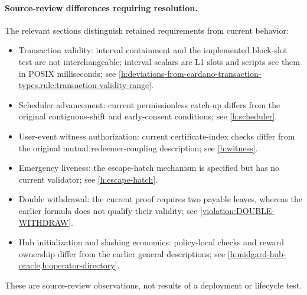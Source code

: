 \documentclass[../midgard.tex]{subfiles}
\begin{document}
\paragraph{Source-review differences requiring resolution.}
The relevant sections distinguish retained requirements from current behavior:
\begin{itemize}
  \item Transaction validity: interval containment and the implemented block-slot test are not interchangeable; interval scalars are L1 slots and scripts see them in POSIX milliseconds; see \cref{h:deviations-from-cardano-transaction-types,rule:transaction-validity-range}.
  \item Scheduler advancement: current permissionless catch-up differs from the original contiguous-shift and early-consent conditions; see \cref{h:scheduler}.
  \item User-event witness authorization: current certificate-index checks differ from the original mutual redeemer-coupling description; see \cref{h:witness}.
  \item Emergency liveness: the escape-hatch mechanism is specified but has no current validator; see \cref{h:escape-hatch}.
  \item Double withdrawal: the current proof requires two payable leaves, whereas the earlier formula does not qualify their validity; see \cref{violation:DOUBLE-WITHDRAW}.
  \item Hub initialization and slashing economics: policy-local checks and reward ownership differ from the earlier general descriptions; see \cref{h:midgard-hub-oracle,h:operator-directory}.
\end{itemize}
These are source-review observations, not results of a deployment or lifecycle test.
\end{document}
